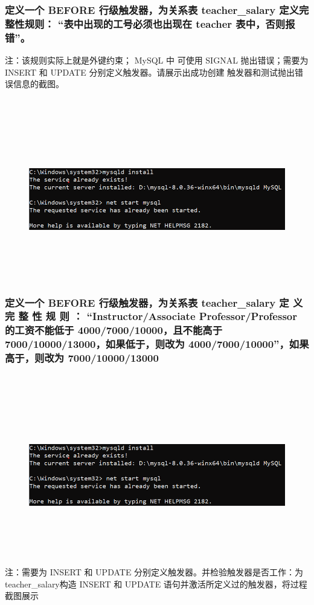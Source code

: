 \documentclass{ctexart}
\begin{document}
\subsubsection{定义一个 BEFORE 行级触发器，为关系表 teacher\_salary 定义完整性规则： “表中出现的工号必须也出现在 teacher 表中，否则报错”。}
注：该规则实际上就是外键约束； MySQL 中
可使用 SIGNAL 抛出错误；需要为 INSERT 和 UPDATE 分别定义触发器。请展示出成功创建
触发器和测试抛出错误信息的截图。
\begin{lstlisting}[language=sql]
	
\end{lstlisting}
\begin{figure}[H]
	\centering 
	\includegraphics[height=7cm,width=14cm]{1.png}
	\end{figure}
\subsubsection{定义一个 BEFORE 行级触发器，为关系表 teacher\_salary 定 义 完 整 性 规 则 ：
“Instructor/Associate Professor/Professor 的工资不能低于 4000/7000/10000，且不能高于
7000/10000/13000，如果低于，则改为 4000/7000/10000”，如果高于，则改为 7000/10000/13000}
\begin{lstlisting}[language=sql]
	
\end{lstlisting}
\begin{figure}[H]
	\centering 
	\includegraphics[height=7cm,width=14cm]{1.png}
	\end{figure}
注：需要为 INSERT 和 UPDATE 分别定义触发器。并检验触发器是否工作：为 teacher\_salary构造 INSERT 和 UPDATE 语句并激活所定义过的触发器，将过程截图展示
\end{document}
